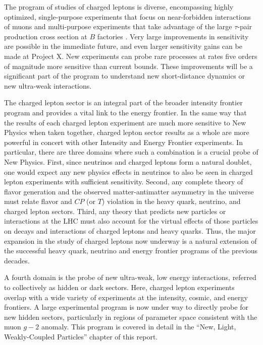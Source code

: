 The program of studies of charged leptons is diverse, encompassing highly optimized, single-purpose experiments that focus on near-forbidden interactions of muons and multi-purpose experiments that take advantage of the large $\tau$-pair production cross section at $B$ factories .
Very large
improvements in sensitivity are possible in the immediate future, and even larger sensitivity gains can be made at Project X.  New
experiments can probe rare processes at rates five orders
of magnitude more sensitive than current bounds. These 
improvements will be a significant part of the program to understand new short-distance dynamics or new ultra-weak interactions.

The charged lepton sector is an integral part of the broader intensity
frontier program and provides a vital link to the energy frontier. In the same way that the results of each charged
lepton experiment are much more sensitive to New Physics when taken together, charged lepton sector results as a whole are more
powerful in concert with other Intensity and Energy Frontier experiments. In
particular, there are three domains where such a combination is a
crucial probe of New Physics.   First, since neutrinos and charged leptons form a 
natural doublet, one would expect any new physics effects
 in neutrinos to also be seen in charged lepton experiments with sufficient sensitivity.  
 Second, any complete theory of 
 flavor generation and the observed matter-antimatter asymmetry in the universe must 
 relate flavor and $C\!P$ (or $T$) violation in the heavy quark, neutrino, and charged lepton sectors.  
 Third,  any theory that predicts new particles or interactions at the LHC must also account for the virtual effects of those particles on decays and interactions of charged leptons and heavy quarks.
Thus, the major expansion in the study of charged leptons now underway is a natural extension of the successful heavy quark, neutrino and energy frontier programs of the previous decades.

A fourth domain is the probe of new ultra-weak, low energy interactions, referred to collectively  as hidden or dark sectors.  Here, charged lepton experiments overlap  with a wide variety of
experiments at the intensity, cosmic, and energy frontiers.  A large
experimental program is now under way to directly probe for new
hidden sectors, particularly in regions of parameter space
consistent with the muon $g-2$ anomaly.  This program is covered
in detail in the ``New, Light, Weakly-Coupled Particles'' chapter of this report.

